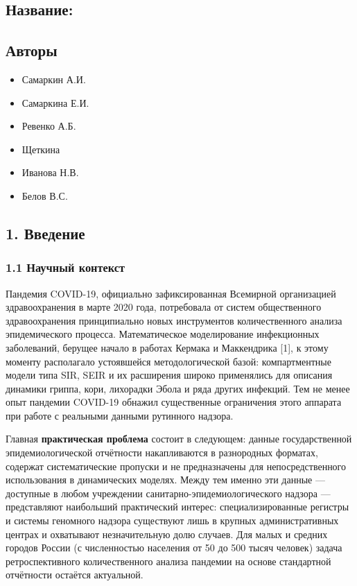 \documentclass[12pt]{article}
\begin{document}
\subsection{Название:}\label{ux43dux430ux437ux432ux430ux43dux438ux435}

\subsection{Авторы}\label{ux430ux432ux442ux43eux440ux44b}

\begin{itemize}
\item
  Самаркин А.И.
\item
  Самаркина Е.И.
\item
  Ревенко А.Б.
\item
  Щеткина
\item
  Иванова Н.В.
\item
  Белов В.С.
\end{itemize}

\subsection{1. Введение}\label{ux432ux432ux435ux434ux435ux43dux438ux435}

\subsubsection{1.1 Научный
контекст}\label{ux43dux430ux443ux447ux43dux44bux439-ux43aux43eux43dux442ux435ux43aux441ux442}

Пандемия COVID-19, официально зафиксированная Всемирной организацией
здравоохранения в марте 2020 года, потребовала от систем общественного
здравоохранения принципиально новых инструментов количественного анализа
эпидемического процесса. Математическое моделирование инфекционных
заболеваний, берущее начало в работах Кермака и Маккендрика {[}1{]}, к
этому моменту располагало устоявшейся методологической базой:
компартментные модели типа SIR, SEIR и их расширения широко применялись
для описания динамики гриппа, кори, лихорадки Эбола и ряда других
инфекций. Тем не менее опыт пандемии COVID-19 обнажил существенные
ограничения этого аппарата при работе с реальными данными рутинного
надзора.

Главная \textbf{практическая проблема} состоит в следующем: данные
государственной эпидемиологической отчётности накапливаются в
разнородных форматах, содержат систематические пропуски и не
предназначены для непосредственного использования в динамических
моделях. Между тем именно эти данные --- доступные в любом учреждении
санитарно-эпидемиологического надзора --- представляют наибольший
практический интерес: специализированные регистры и системы геномного
надзора существуют лишь в крупных административных центрах и охватывают
незначительную долю случаев. Для малых и средних городов России (с
численностью населения от 50 до 500 тысяч человек) задача
ретроспективного количественного анализа пандемии на основе стандартной
отчётности остаётся актуальной.
\end{document}
